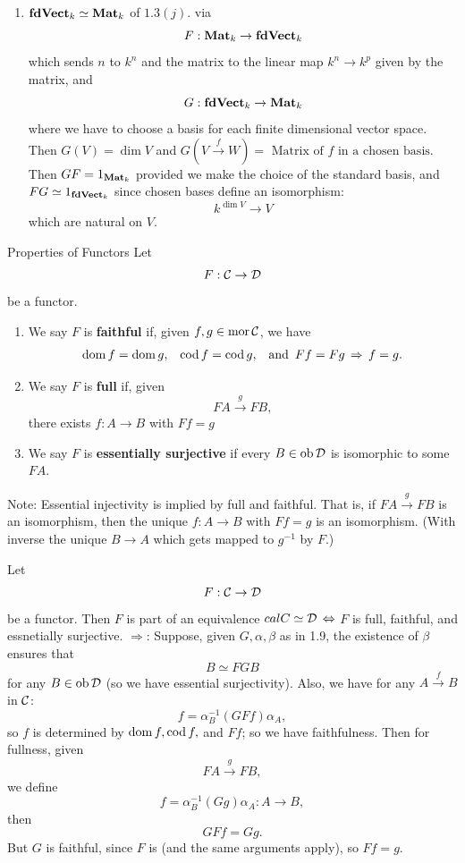 \documentclass{article}
\begin{document}
\begin{enumerate}
    \item[(c)] $\textbf{fdVect$_{k}$} \simeq \textbf{Mat$_{k}$}$ of $1.3(j)$. via \[ F : \textbf{Mat$_{k}$} \to \textbf{fdVect$_{k}$} \] which sends $n$ to $k^{n}$ and the matrix to the linear map $k^{n} \to k^{p}$ given by the matrix, and \[ G: \textbf{fdVect$_{k}$} \to \textbf{Mat$_{k}$} \] where we have to choose a basis for each finite dimensional vector space. 
    Then $G(V) = \dim V$ and $G(V \xrightarrow f W) = \text{ Matrix of $f$ in a chosen basis}$. Then $GF=1_{\textbf{Mat$_{k}$}}$ provided we make the choice of the standard basis, and $FG \simeq 1_{\textbf{fdVect$_{k}$}}$ since chosen bases define an isomorphism: \[ k^{\dim V} \to V \] which are natural on $V$.
\end{enumerate}
\begin{fancydefine}{Properties of Functors}
    Let \[ F : \mathcal{C} \to \mathcal{D}\] be a functor.
    \begin{enumerate}
        \item[(a)] We say $F$ is \textbf{faithful} if, given $f,g \in \operatorname{mor} \mathcal{C}$, we have \begin{align*}
            \operatorname{dom} f = \operatorname{dom} g, & & \operatorname{cod} f = \operatorname{cod} g, & & \text{and} \, \, \,   Ff=Fg \, \Rightarrow \, f=g.
        \end{align*}
        \item[(b)] We say $F$ is \textbf{full} if, given \[ FA \xrightarrow g FB, \] there exists $f : A \to B$ with $Ff = g$
        \item[(c)] We say $F$ is \textbf{essentially surjective} if every $B \in \operatorname{ob} \mathcal{D}$ is isomorphic to some $FA$.
    \end{enumerate}
    Note:  Essential injectivity is implied by full and faithful. That is, if $FA \xrightarrow g FB$ is an isomorphism, then the unique $f : A \to B$ with $Ff = g$ is an isomorphism. (With inverse the unique $B \to A$ which gets mapped to $g^{-1}$ by $F$.)
\end{fancydefine}
\lem Let \[ F: \mathcal{C} \to \mathcal{D} \] be a functor. Then $F$ is part of an equivalence $calC \simeq \mathcal{D} \, \Leftrightarrow$ $F$ is full, faithful, and essnetially surjective.
\proof $\Rightarrow$: Suppose, given $G,\alpha, \beta$ as in 1.9, the existence of $\beta$ ensures that \[ B \simeq FGB \] for any $B \in \operatorname{ob} \mathcal{D}$ (so we have essential surjectivity). Also, we have for any $A \xrightarrow f B$ in $\mathcal{C}$: \[f = \alpha_{B}^{-1}(GFf)\alpha_{A}, \] so $f$ is determined by $\operatorname{dom} f, \operatorname{cod} f,$ and $Ff$; so we have faithfulness. Then for fullness, given \[ FA \xrightarrow g FB, \] we define \[ f = \alpha_{B}^{-1}(Gg)\alpha_{A} : A \to B, \] then \[ GFf = Gg. \] But $G$ is faithful, since $F$ is (and the same arguments apply), so $Ff=g$.\gap 
\end{document}
